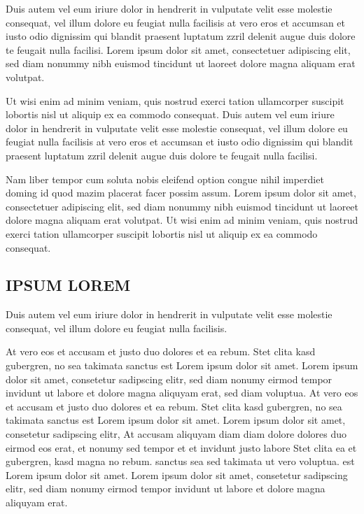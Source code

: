 \documentclass[]{../metanetpaper}
\begin{document}
Duis autem vel eum iriure dolor in hendrerit in vulputate velit esse molestie consequat, vel illum dolore eu feugiat nulla facilisis at vero eros et accumsan et iusto odio dignissim qui blandit praesent luptatum zzril delenit augue duis dolore te feugait nulla facilisi. Lorem ipsum dolor sit amet, consectetuer adipiscing elit, sed diam nonummy nibh euismod tincidunt ut laoreet dolore magna aliquam erat volutpat.   

Ut wisi enim ad minim veniam, quis nostrud exerci tation ullamcorper suscipit lobortis nisl ut aliquip ex ea commodo consequat. Duis autem vel eum iriure dolor in hendrerit in vulputate velit esse molestie consequat, vel illum dolore eu feugiat nulla facilisis at vero eros et accumsan et iusto odio dignissim qui blandit praesent luptatum zzril delenit augue duis dolore te feugait nulla facilisi.   

Nam liber tempor cum soluta nobis eleifend option congue nihil imperdiet doming id quod mazim placerat facer possim assum. Lorem ipsum dolor sit amet, consectetuer adipiscing elit, sed diam nonummy nibh euismod tincidunt ut laoreet dolore magna aliquam erat volutpat. Ut wisi enim ad minim veniam, quis nostrud exerci tation ullamcorper suscipit lobortis nisl ut aliquip ex ea commodo consequat.   
\subsection{IPSUM LOREM}
Duis autem vel eum iriure dolor in hendrerit in vulputate velit esse molestie consequat, vel illum dolore eu feugiat nulla facilisis.   

At vero eos et accusam et justo duo dolores et ea rebum. Stet clita kasd gubergren, no sea takimata sanctus est Lorem ipsum dolor sit amet. Lorem ipsum dolor sit amet, consetetur sadipscing elitr, sed diam nonumy eirmod tempor invidunt ut labore et dolore magna aliquyam erat, sed diam voluptua. At vero eos et accusam et justo duo dolores et ea rebum. Stet clita kasd gubergren, no sea takimata sanctus est Lorem ipsum dolor sit amet. Lorem ipsum dolor sit amet, consetetur sadipscing elitr, At accusam aliquyam diam diam dolore dolores duo eirmod eos erat, et nonumy sed tempor et et invidunt justo labore Stet clita ea et gubergren, kasd magna no rebum. sanctus sea sed takimata ut vero voluptua. est Lorem ipsum dolor sit amet. Lorem ipsum dolor sit amet, consetetur sadipscing elitr, sed diam nonumy eirmod tempor invidunt ut labore et dolore magna aliquyam erat.   
\end{document}
